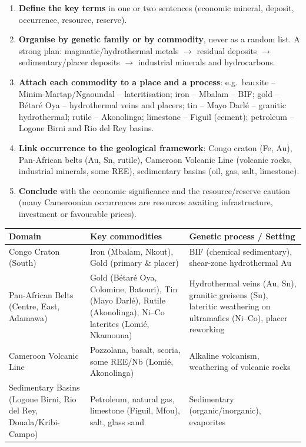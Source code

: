 \documentclass[11pt]{article}
\begin{document}
\begin{methode}
\begin{enumerate}
\item \textbf{Define the key terms} in one or two sentences (economic mineral, deposit, occurrence, resource, reserve).
\item \textbf{Organise by genetic family or by commodity}, never as a random list. A strong plan: magmatic/hydrothermal metals $\rightarrow$ residual deposits $\rightarrow$ sedimentary/placer deposits $\rightarrow$ industrial minerals and hydrocarbons.
\item \textbf{Attach each commodity to a place and a process}: e.g.\ bauxite -- Minim-Martap/Ngaoundal -- lateritisation; iron -- Mbalam -- BIF; gold -- B\'etar\'e Oya -- hydrothermal veins and placers; tin -- Mayo Darl\'e -- granitic hydrothermal; rutile -- Akonolinga; limestone -- Figuil (cement); petroleum -- Logone Birni and Rio del Rey basins.
\item \textbf{Link occurrence to the geological framework}: Congo craton (Fe, Au), Pan-African belts (Au, Sn, rutile), Cameroon Volcanic Line (volcanic rocks, industrial minerals, some REE), sedimentary basins (oil, gas, salt, limestone).
\item \textbf{Conclude} with the economic significance and the resource/reserve caution (many Cameroonian occurrences are resources awaiting infrastructure, investment or favourable prices).
\end{enumerate}
\end{methode}

\begin{aretenir}
\begin{center}
\begin{tabularx}{\linewidth}{|l|X|X|}
\hline
\rowcolor{popblueL}
\textbf{Domain} & \textbf{Key commodities} & \textbf{Genetic process / Setting} \\
\hline
Congo Craton (South) & Iron (Mbalam, Nkout), Gold (primary \& placer) & BIF (chemical sedimentary), shear-zone hydrothermal Au \\
Pan-African Belts (Centre, East, Adamawa) & Gold (B\'etar\'e Oya, Colomine, Batouri), Tin (Mayo Darl\'e), Rutile (Akonolinga), Ni--Co laterites (Lomi\'e, Nkamouna) & Hydrothermal veins (Au, Sn), granitic greisens (Sn), lateritic weathering on ultramafics (Ni--Co), placer reworking \\
Cameroon Volcanic Line & Pozzolana, basalt, scoria, some REE/Nb (Lomi\'e, Akonolinga) & Alkaline volcanism, weathering of volcanic rocks \\
Sedimentary Basins (Logone Birni, Rio del Rey, Douala/Kribi-Campo) & Petroleum, natural gas, limestone (Figuil, Mfou), salt, glass sand & Sedimentary (organic/inorganic), evaporites \\
\hline
\end{tabularx}
\end{center}
\end{aretenir}
\end{document}
